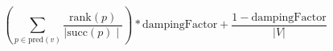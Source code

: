 \documentclass{scrartcl}
\begin{document}
\[
  \left(
    \sum\limits_{p \in \text{pred}(v)} \frac{\text{rank}(p)}{\mid\text{succ}(p)\mid}
  \right) * \text{dampingFactor} + \frac{1 - \text{dampingFactor}}{|V|}
\]
\end{document}
